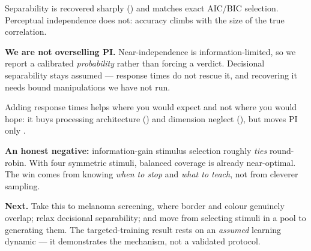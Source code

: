 \documentclass[final]{article}
\newlength{\colw}
\begin{document}
\begin{minipage}[t]{\colw}


{\bodyfont
Separability is recovered sharply () and matches exact
AIC/BIC selection. Perceptual independence does not: accuracy climbs with the
size of the true correlation.
\par}

\begin{callout}
\textbf{We are not overselling PI.} Near-independence is information-limited,
so we report a calibrated \emph{probability} rather than forcing a verdict.
Decisional separability stays assumed --- response times do not rescue it, and
recovering it needs bound manipulations we have not run.
\end{callout}

{\bodyfont
Adding response times helps where you would expect and not where you would
hope: it buys processing architecture () and dimension neglect
(), but moves PI only .
\par}
\end{minipage}%
\hfill
\begin{minipage}[t]{\colw}



{\bodyfont
\textbf{An honest negative:} information-gain stimulus selection roughly
\emph{ties} round-robin. With four symmetric stimuli, balanced coverage is
already near-optimal. The win comes from knowing \emph{when to stop} and
\emph{what to teach}, not from cleverer sampling.
\par}

\begin{callout}
\textbf{Next.} Take this to melanoma screening, where border and colour genuinely
overlap; relax decisional separability; and move from selecting stimuli in a
pool to generating them. The targeted-training result rests on an
\emph{assumed} learning dynamic --- it demonstrates the mechanism, not a
validated protocol.
\end{callout}
\end{minipage}
\end{document}
